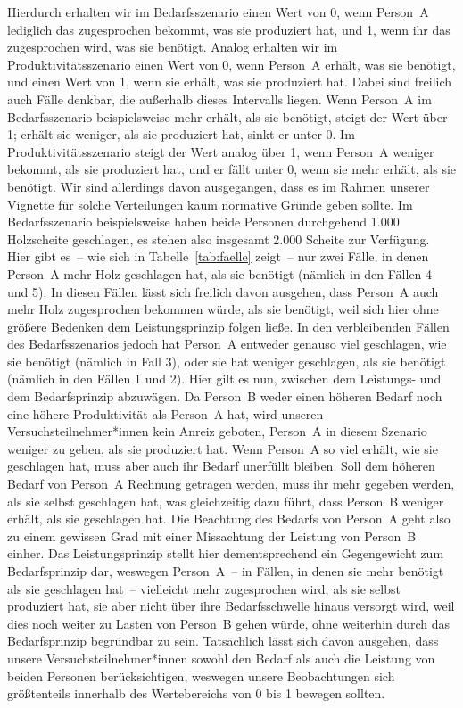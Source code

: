 \documentclass[justified,nobib,symmetric,twoside]{tufte-handout}
\begin{document}
Hierdurch erhalten wir im Bedarfsszenario einen Wert von 0, wenn Person~A lediglich das zugesprochen bekommt, was sie produziert hat, und 1, wenn ihr das zugesprochen wird, was sie benötigt.
Analog erhalten wir im Produktivitätsszenario einen Wert von 0, wenn Person~A erhält, was sie benötigt, und einen Wert von 1, wenn sie erhält, was sie produziert hat.
Dabei sind freilich auch Fälle denkbar, die außerhalb dieses Intervalls liegen.
Wenn Person~A im Bedarfsszenario beispielsweise mehr erhält, als sie benötigt, steigt der Wert über 1; erhält sie weniger, als sie produziert hat, sinkt er unter 0.
Im Produktivitätsszenario steigt der Wert analog über 1, wenn Person~A weniger bekommt, als sie produziert hat, und er fällt unter 0, wenn sie mehr erhält, als sie benötigt.
Wir sind allerdings davon ausgegangen, dass es im Rahmen unserer Vignette für solche Verteilungen kaum normative Gründe geben sollte.
Im Bedarfsszenario beispielsweise haben beide Personen durchgehend 1.000 Holzscheite geschlagen, es stehen also insgesamt 2.000 Scheite zur Verfügung.
Hier gibt es~-- wie sich in Tabelle~\ref{tab:faelle} zeigt~-- nur zwei Fälle, in denen Person~A mehr Holz geschlagen hat, als sie benötigt (nämlich in den Fällen 4 und 5).
In diesen Fällen lässt sich freilich davon ausgehen, dass Person~A auch mehr Holz zugesprochen bekommen würde, als sie benötigt, weil sich hier ohne größere Bedenken dem Leistungsprinzip folgen ließe.
In den verbleibenden Fällen des Bedarfsszenarios jedoch hat Person~A entweder genauso viel geschlagen, wie sie benötigt (nämlich in Fall 3), oder sie hat weniger geschlagen, als sie benötigt (nämlich in den Fällen 1 und 2).
Hier gilt es nun, zwischen dem Leistungs- und dem Bedarfsprinzip abzuwägen.
Da Person~B weder einen höheren Bedarf noch eine höhere Produktivität als Person~A hat, wird unseren Versuchsteilnehmer*innen kein Anreiz geboten, Person~A in diesem Szenario weniger zu geben, als sie produziert hat.
Wenn Person~A so viel erhält, wie sie geschlagen hat, muss aber auch ihr Bedarf unerfüllt bleiben.
Soll dem höheren Bedarf von Person~A Rechnung getragen werden, muss ihr mehr gegeben werden, als sie selbst geschlagen hat, was gleichzeitig dazu führt, dass Person~B weniger erhält, als sie geschlagen hat.
Die Beachtung des Bedarfs von Person~A geht also zu einem gewissen Grad mit einer Missachtung der Leistung von Person~B einher.
Das Leistungsprinzip stellt hier dementsprechend ein Gegengewicht zum Bedarfsprinzip dar, weswegen Person~A~-- in Fällen, in denen sie mehr benötigt als sie geschlagen hat~-- vielleicht mehr zugesprochen wird, als sie selbst produziert hat, sie aber nicht über ihre Bedarfsschwelle hinaus versorgt wird, weil dies noch weiter zu Lasten von Person~B gehen würde, ohne weiterhin durch das Bedarfsprinzip begründbar zu sein.
Tatsächlich lässt sich davon ausgehen, dass unsere Versuchsteilnehmer*innen sowohl den Bedarf als auch die Leistung von beiden Personen berücksichtigen, weswegen unsere Beobachtungen sich größtenteils innerhalb des Wertebereichs von 0 bis 1 bewegen sollten.
\end{document}
